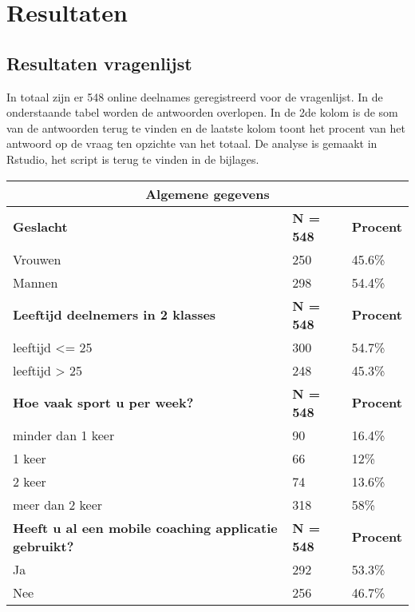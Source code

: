 \chapter{Resultaten}
\label{ch:resultaten}

\section{Resultaten vragenlijst}
\label{sec:Resultaten vragenlijst}
In totaal zijn er 548 online deelnames geregistreerd voor de vragenlijst. In de onderstaande tabel worden de antwoorden overlopen. In de 2de kolom is de som van de antwoorden terug te vinden en de laatste kolom toont het procent van het antwoord op de vraag ten opzichte van het totaal. De analyse is gemaakt in Rstudio, het script is terug te vinden in de bijlages.
\begin{center}
\begin{tabular}{ |p{10cm}|p{2cm}|p{2cm}| }
 \hline
 \multicolumn{3}{|c|}{Algemene gegevens} \\
 \hline
 \textbf{Geslacht} & \textbf{N = 548} &\textbf{Procent}\\ 
 \hline
 Vrouwen   & 250    &45.6\%   \\
 Mannen &   298  &54.4\%   \\
 \hline
 \textbf{Leeftijd deelnemers in 2 klasses} & \textbf{N = 548} &\textbf{Procent}\\ 
 \hline
 leeftijd <= 25   & 300    &54.7\%   \\
 leeftijd > 25 &   248  &45.3\%   \\
 \hline
  \textbf{Hoe vaak sport u per week? } & \textbf{N = 548} &\textbf{Procent}\\ 
 \hline
 minder dan 1 keer   & 90    &16.4\%   \\
 1 keer &   66  &12\%   \\
 2 keer &   74  &13.6\%   \\
meer dan 2 keer &   318 &58\%   \\
 \hline
     \textbf{Heeft u al een mobile coaching applicatie gebruikt?} & \textbf{N = 548} &\textbf{Procent}\\ 
 \hline
Ja   & 292    &53.3\%   \\
Nee &   256  &46.7\%   \\
  \hline
\end{tabular}
\end{center}



